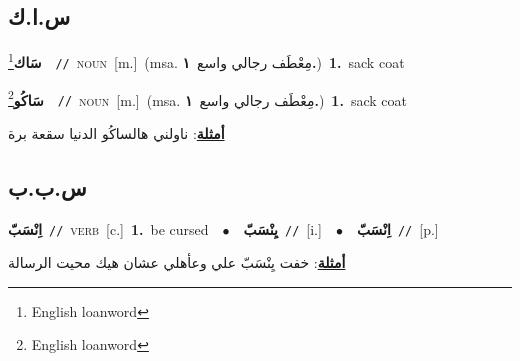\documentclass[10pt,a4paper,twoside]{article} %
\begin{document}
\begin{multicols}{2}
\vspace{-3mm}
\subsection*{\color{blue}\foreignlanguage{arabic}{س.ا.ك}\color{blue}{ (ntws)}} 

{\setlength\topsep{0pt}\textbf{\foreignlanguage{arabic}{سَاك}}\footnote{English loanword}\ \ {\color{gray}\texttt{//}\color{black}}\ \textsc{noun}\ [m.]\ \color{gray}(msa. \foreignlanguage{arabic}{مِعْطَف رجالي واسع}~\foreignlanguage{arabic}{\textbf{١.}})\color{black}\ \textbf{1.}~sack coat\ 

{\setlength\topsep{0pt}\textbf{\foreignlanguage{arabic}{سَاكُو}}\footnote{English loanword}\ \ {\color{gray}\texttt{//}\color{black}}\ \textsc{noun}\ [m.]\ \color{gray}(msa. \foreignlanguage{arabic}{مِعْطَف رجالي واسع}~\foreignlanguage{arabic}{\textbf{١.}})\color{black}\ \textbf{1.}~sack coat\  \begin{flushright}\color{gray}\foreignlanguage{arabic}{\textbf{\underline{\foreignlanguage{arabic}{أمثلة}}}: ناولني هالساكُو الدنيا سقعة برة}\end{flushright}\color{black}} \vspace{2mm}

\vspace{-3mm}
\subsection*{\color{blue}\foreignlanguage{arabic}{س.ب.ب}\color{blue}{}} 

{\setlength\topsep{0pt}\textbf{\foreignlanguage{arabic}{اِنْسَبّ}}\ {\color{gray}\texttt{//}\color{black}}\ \textsc{verb}\ [c.]\ \textbf{1.}~be cursed\ \ $\bullet$\ \ \setlength\topsep{0pt}\textbf{\foreignlanguage{arabic}{يِنْسَبّ}}\ {\color{gray}\texttt{//}\color{black}}\ [i.]\ \ $\bullet$\ \ \setlength\topsep{0pt}\textbf{\foreignlanguage{arabic}{اِنْسَبّ}}\ {\color{gray}\texttt{//}\color{black}}\ [p.]\  \begin{flushright}\color{gray}\foreignlanguage{arabic}{\textbf{\underline{\foreignlanguage{arabic}{أمثلة}}}: خفت يِنْسَبّ علي وعأهلي عشان هيك محيت الرسالة}\end{flushright}\color{black}} \vspace{2mm}

}
\end{multicols}
\end{document}
